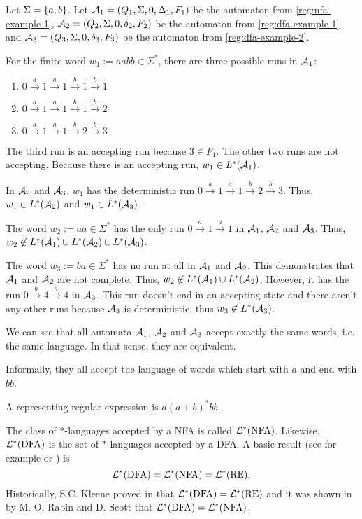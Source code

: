 \begin{simpleexample}
Let $\Sigma = \Set{a,b}$. Let $\mathcal{A}_1 = (Q_1,\Sigma,0,\Delta_1,F_1)$ be the automaton from \cref{reg:nfa-example-1}, $\mathcal{A}_2 = (Q_2,\Sigma,0,\delta_2,F_2)$ be the automaton from \cref{reg:dfa-example-1} and $\mathcal{A}_3 = (Q_3,\Sigma,0,\delta_3,F_3)$ be the automaton from \cref{reg:dfa-example-2}.

For the finite word $w_1 := aabb \in \Sigma^*$, there are three possible runs in $\mathcal{A}_1$:
\begin{enumerate}
\item $0 \xrightarrow{a} 1 \xrightarrow{a} 1 \xrightarrow{b} 1 \xrightarrow{b} 1$
\item $0 \xrightarrow{a} 1 \xrightarrow{a} 1 \xrightarrow{b} 1 \xrightarrow{b} 2$
\item $0 \xrightarrow{a} 1 \xrightarrow{a} 1 \xrightarrow{b} 2 \xrightarrow{b} 3$
\end{enumerate}
The third run is an accepting run because $3 \in F_1$. The other two runs are not accepting. Because there is an accepting run, $w_1 \in L^*(\mathcal{A}_1)$.

In $\mathcal{A}_2$ and $\mathcal{A}_3$, $w_1$ has the deterministic run $0 \xrightarrow{a} 1 \xrightarrow{a} 1 \xrightarrow{b} 2 \xrightarrow{b} 3$. Thus, $w_1 \in L^*(\mathcal{A}_2)$ and $w_1 \in L^*(\mathcal{A}_3)$.

The word $w_2 := aa \in \Sigma^*$ has the only run $0 \xrightarrow{a} 1 \xrightarrow{a} 1$ in $\mathcal{A}_1$, $\mathcal{A}_2$ and $\mathcal{A}_3$. Thus, $w_2 \not\in L^*(\mathcal{A}_1) \cup L^*(\mathcal{A}_2) \cup L^*(\mathcal{A}_3)$.

The word $w_3 := ba \in \Sigma^*$ has no run at all in $\mathcal{A}_1$ and $\mathcal{A}_2$. This demonstrates that $\mathcal{A}_1$ and $\mathcal{A}_2$ are not complete. Thus, $w_2 \not\in L^*(\mathcal{A}_1) \cup L^*(\mathcal{A}_2)$. However, it has the run $0 \xrightarrow{b} 4 \xrightarrow{a} 4$ in $\mathcal{A}_3$. This run doesn't end in an accepting state and there aren't any other runs because $\mathcal{A}_3$ is deterministic, thus $w_3 \not\in L^*(\mathcal{A}_3)$.

We can see that all automata $\mathcal{A}_1$, $\mathcal{A}_2$ and $\mathcal{A}_3$ accept exactly the same words, i.e. the same language. In that sense, they are equivalent.

Informally, they all accept the language of words which start with $a$ and end with $bb$.

A representing regular expression is $a(a+b)^*bb$.
\end{simpleexample}

The class of $*$-languages accepted by a NFA is called $\mathcal{L}^*(\text{NFA})$. Likewise, $\mathcal{L}^*(\text{DFA})$ is the set of $*$-languages accepted by a DFA. A basic result (see for example \cite{FinAutLogR109} or \cite{InfWordsR110}) is
\[ \mathcal{L}^*(\text{DFA}) = \mathcal{L}^*(\text{NFA}) = \mathcal{L}^*(\text{RE}) . \]
Historically, S.C. Kleene proved in \cite{Kleene56} that $\mathcal{L}^*(\text{DFA}) = \mathcal{L}^*(\text{RE}) $ and it was shown in \cite{FinAutRabin59} by M. O. Rabin and D. Scott that $\mathcal{L}^*(\text{DFA}) = \mathcal{L}^*(\text{NFA})$.

